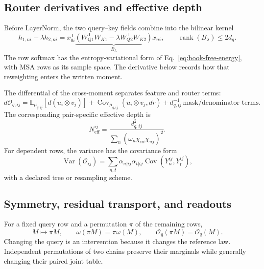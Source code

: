 \subsection{Router derivatives and effective depth}

Before LayerNorm, the two query--key fields combine into the bilinear kernel
\begin{equation}
h_{1,ni}-\lambda h_{2,ni}
=x_{0i}^{\mathsf T}
\underbrace{(W_{Q1}^{\mathsf T}W_{K1}-\lambda W_{Q2}^{\mathsf T}W_{K2})}_{B_\lambda}x_{ni},
\qquad \operatorname{rank}(B_\lambda)\leq2d_q.
\label{eq:msa-pairformer-effective-bilinear-kernel}
\end{equation}
The row softmax has the entropy-variational form of Eq.~\ref{eq:book-free-energy}, with MSA rows
as its sample space.  The derivative below records how that reweighting enters the written moment.

The differential of the cross-moment separates feature and router terms:
\begin{equation}
d\mathcal O_{q,ij}
=\mathbb E_{\mu_{q,ij}}[d(u_i\otimes v_j)]
+\operatorname{Cov}_{\mu_{q,ij}}(u_i\otimes v_j,dr)
+d_{q,ij}^{-1}\,\text{mask/denominator terms}.
\label{eq:msa-pairformer-total-moment-differential}
\end{equation}
The corresponding pair-specific effective depth is
\begin{equation}
N_{\mathrm{eff}}^{ij}
=\frac{d_{q,ij}^{2}}{\sum_n(\omega_n\chi_{ni}\chi_{nj})^2}.
\label{eq:msa-pairformer-effective-depth}
\end{equation}
For dependent rows, the variance has the covariance form
\begin{equation}
\operatorname{Var}(\mathcal O_{ij})
=\sum_{n,t}\alpha_{n|ij}\alpha_{t|ij}\operatorname{Cov}(Y_n^{ij},Y_t^{ij}),
\label{eq:msa-pairformer-dependent-row-variance}
\end{equation}
with a declared tree or resampling scheme.

\subsection{Symmetry, residual transport, and readouts}

For a fixed query row and a permutation $\pi$ of the remaining rows,
\begin{equation}
M\mapsto\pi M,\qquad \omega(\pi M)=\pi\omega(M),\qquad
\mathcal O_q(\pi M)=\mathcal O_q(M).
\label{eq:msa-pairformer-row-equivariance}
\end{equation}
Changing the query is an intervention because it changes the reference law.  Independent permutations
of two chains preserve their marginals while generally changing their paired joint table.

